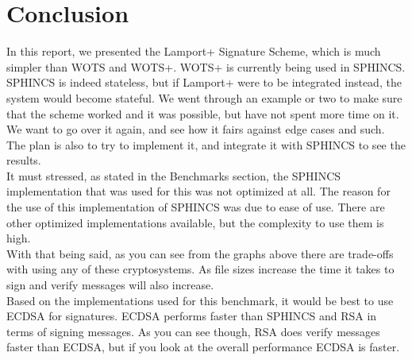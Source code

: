 \documentclass[]{scrartcl}
\begin{document}
\section*{Conclusion}
In this report, we presented the Lamport+ Signature Scheme, which is much simpler than WOTS and WOTS+. WOTS+ is currently being used in SPHINCS. SPHINCS is indeed stateless, but if Lamport+ were to be integrated instead, the system would become stateful. We went through an example or two to make sure that the scheme worked and it was possible, but have not spent more time on it. We want to go over it again, and see how it fairs against edge cases and such. The plan is also to try to implement it, and integrate it with SPHINCS to see the results.\\
It must stressed, as stated in the Benchmarks section, the SPHINCS implementation that was used for this was not optimized at all. The reason for the use of this implementation of SPHINCS was due to ease of use. There are other optimized implementations available, but the complexity to use them is high.\\
With that being said, as you can see from the graphs above there are trade-offs with using any of these cryptosystems. As file sizes increase the time it takes to sign and verify messages will also increase.\\
Based on the implementations used for this benchmark, it would be best to use ECDSA for signatures. ECDSA performs faster than SPHINCS and RSA in terms of signing messages. As you can see though, RSA does verify messages faster than ECDSA, but if you look at the overall performance ECDSA is faster.
\end{document}
